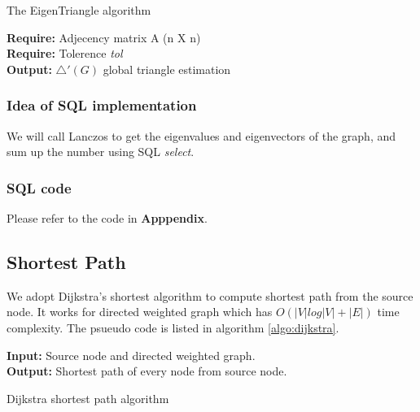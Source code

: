 \begin{algorithm}
\caption{The EigenTriangle algorithm}
{\bf Require: } Adjecency matrix A (n X n)\\
{\bf Require: } Tolerence \emph{tol}\\
{\bf Output: } $\bigtriangleup'(G)$ global triangle estimation
\begin{algorithmic}
\STATE{$\overrightarrow{\Lambda} \gets [\lambda_{1}]$}
\REPEAT 
\end{algorithmic}
\end{algorithm}

\subsubsection{Idea of SQL implementation}
We will call Lanczos to get the eigenvalues and eigenvectors of the graph, and sum up the number using SQL \emph{select}.

\subsubsection{SQL code}
Please refer to the code in {\bf Apppendix}.

\subsection{Shortest Path}
We adopt Dijkstra's shortest algorithm to compute shortest path from the source node. It works for directed weighted
graph which has $O(|V| log |V| + |E|)$ time complexity. The psueudo code is listed in algorithm \ref{algo:dijkstra}.

\begin{algorithm}
{\bf Input:} Source node and directed weighted graph. \\
{\bf Output:} Shortest path of every node from source node. 
\begin{algorithmic}
\caption{Dijkstra shortest path algorithm}
\ENDFOR
{}
        \ENDIF
    \ENDFOR
\ENDWHILE
\end{algorithmic}
\label{algo:dijkstra}
\end{algorithm}

